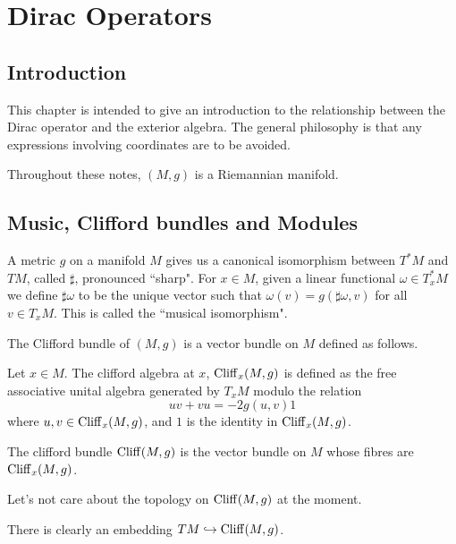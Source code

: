 
\chapter{Dirac Operators} %

\label{Dirac} %




\section{Introduction}
This chapter is intended to give an introduction to the relationship between
the Dirac operator and the exterior algebra. The general philosophy
is that any expressions involving coordinates are to be avoided.

Throughout these notes, $(M,g)$ is a Riemannian manifold.

\section{Music, Clifford bundles and Modules}
A metric $g$ on a manifold $M$ gives us a canonical isomorphism between $T^*M$
and $TM$, called $\sharp$, pronounced ``sharp". For $x \in M$, given a linear functional
$\omega \in T^*_xM$ we define $\sharp\omega$ to be the unique
vector such that $\omega(v) = g(\sharp\omega,v)$ for all $v \in T_xM$.
This is called the ``musical isomorphism".

The Clifford bundle of $(M,g)$ is a vector bundle on $M$ defined as follows.
\begin{definition}
    Let $x \in M$. The clifford algebra at $x$, $\operatorname{Cliff}_x(M,g)$ is defined
    as the free associative unital algebra generated by $T_xM$ modulo the relation
    \begin{equation}
        uv+vu = -2g(u,v)1
    \end{equation}
    where $u,v \in \operatorname{Cliff}_x(M,g)$, and $1$ is the identity in $\operatorname{Cliff}_x(M,g)$.
    
    
    The clifford bundle $\operatorname{Cliff}(M,g)$ is the vector bundle on $M$ whose fibres are 
    $\operatorname{Cliff}_x(M,g)$.
\end{definition}
Let's not care about the topology on $\operatorname{Cliff}(M,g)$ at the moment.

There is clearly an embedding $TM \hookrightarrow \operatorname{Cliff}(M,g)$. 

